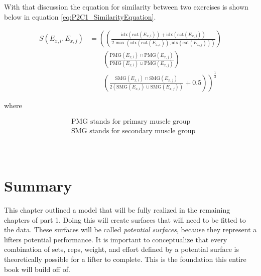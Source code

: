 With that discussion the equation for similarity between two exercises is shown below in equation \ref{eq:P2C1_SimilarityEquation}.

\begin{minipage}{\textwidth}
	\begin{equation}
		\label{eq:P2C1_SimilarityEquation}
		\begin{split}
			S(E_{x,i},E_{x,j}) & = 
			\left(
				\left(
					\frac{
						\text{idx}(\text{cat}(E_{x,i}))+
						\text{idx}(\text{cat}(E_{x,j}))
					}{
						2\max\left(
							\text{idx}(\text{cat}(E_{x,i})),
							\text{idx}(\text{cat}(E_{x,j}))
						\right)
					}
				\right)
			\right.
				\\
				& \;\;\;\;\;\;\;
				\left(
					\frac{
						\text{PMG}(E_{x,i}) \cap 
						\text{PMG}(E_{x,j})			
					}{
						\text{PMG}(E_{x,i}) \cup 
						\text{PMG}(E_{x,j})
					}
				\right)
				\\
				& \;\;\;\;\;\;\;
			\left.			
				\left(
					\frac{
						\text{SMG}(E_{x,i}) \cap 
						\text{SMG}(E_{x,j})			
					}{
						2 \left(
							\text{SMG}(E_{x,i}) \cup 
							\text{SMG}(E_{x,j})
						\right)
					}+0.5
				\right)
			\right)^\frac{1}{3}
		\end{split}
	\end{equation}
	\centerline{where}
	\begin{equation*}
		\begin{split}
		    & \text{PMG stands for primary muscle group} \\
		    & \text{SMG stands for secondary muscle group} \\
		\end{split}
	\end{equation*}
\end{minipage}\\

\section{Summary}

This chapter outlined a model that will be fully realized in the remaining chapters of part 1. Doing this will create surfaces that will need to be fitted to the data. These surfaces will be called \textit{potential surfaces}, because they represent a lifters potential performance. It is important to conceptualize that every combination of sets, reps, weight, and effort defined by a potential surface is theoretically possible for a lifter to complete. This is the foundation this entire book will build off of.

